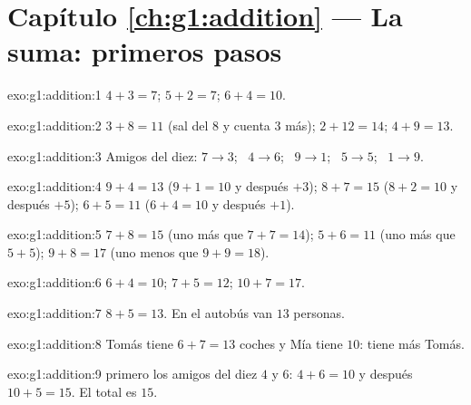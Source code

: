 \section*{Capítulo \ref{ch:g1:addition} --- La suma: primeros pasos}

\begin{solution}{exo:g1:addition:1}
$4 + 3 = 7$; \quad $5 + 2 = 7$; \quad $6 + 4 = 10$.
\end{solution}

\begin{solution}{exo:g1:addition:2}
$3 + 8 = 11$ (sal del $8$ y cuenta $3$ más); \quad
$2 + 12 = 14$; \quad $4 + 9 = 13$.
\end{solution}

\begin{solution}{exo:g1:addition:3}
Amigos del diez: $7 \to 3$; \ $4 \to 6$; \ $9 \to 1$; \ $5 \to 5$;
\ $1 \to 9$.
\end{solution}

\begin{solution}{exo:g1:addition:4}
$9 + 4 = 13$ ($9 + 1 = 10$ y después $+3$); \quad
$8 + 7 = 15$ ($8 + 2 = 10$ y después $+5$); \quad
$6 + 5 = 11$ ($6 + 4 = 10$ y después $+1$).
\end{solution}

\begin{solution}{exo:g1:addition:5}
$7 + 8 = 15$ (uno más que $7 + 7 = 14$); \quad
$5 + 6 = 11$ (uno más que $5 + 5$); \quad
$9 + 8 = 17$ (uno menos que $9 + 9 = 18$).
\end{solution}

\begin{solution}{exo:g1:addition:6}
$6 + 4 = 10$; \quad $7 + 5 = 12$; \quad $10 + 7 = 17$.
\end{solution}

\begin{solution}{exo:g1:addition:7}
$8 + 5 = 13$. En el autobús van $13$ personas.
\end{solution}

\begin{solution}{exo:g1:addition:8}
Tomás tiene $6 + 7 = 13$ coches y Mía tiene $10$: tiene más Tomás.
\end{solution}

\begin{solution}{exo:g1:addition:9}
 primero los amigos del diez $4$ y $6$: $4 + 6 = 10$ y después
$10 + 5 = 15$. El total es $15$.
\end{solution}
